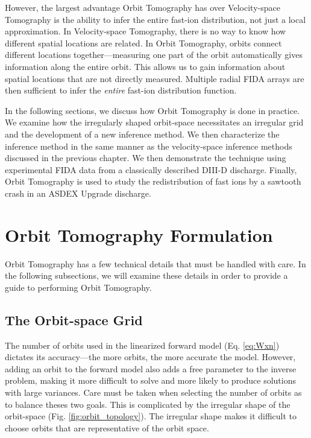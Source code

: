 However, the largest advantage Orbit Tomography has over Velocity-space Tomography is the ability to infer the entire fast-ion distribution, not just a local approximation. In Velocity-space Tomography, there is no way to know how different spatial locations are related. In Orbit Tomography, orbits connect different locations together---measuring one part of the orbit automatically gives information along the entire orbit. This allows us to gain information about spatial locations that are not directly measured. Multiple radial FIDA arrays are then sufficient to infer the \textit{entire} fast-ion distribution function. 

In the following sections, we discuss how Orbit Tomography is done in practice. We examine how the irregularly shaped orbit-space necessitates an irregular grid and the development of a new inference method. We then characterize the inference method in the same manner as the velocity-space inference methods discussed in the previous chapter.
We then demonstrate the technique using experimental FIDA data from a classically described DIII-D discharge. Finally, Orbit Tomography is used to study the redistribution of fast ions by a sawtooth crash in an ASDEX Upgrade discharge.

\section{Orbit Tomography Formulation}\label{sec:orbit_tomography}
Orbit Tomography has a few technical details that must be handled with care. In the following subsections, we will examine these details in order to provide a guide to performing Orbit Tomography.

\subsection{The Orbit-space Grid}
The number of orbits used in the linearized forward model (Eq. \ref{eq:Wxn}) dictates its accuracy---the more orbits, the more accurate the model.
However, adding an orbit to the forward model also adds a free parameter to the inverse problem, making it more difficult to solve and more likely to produce solutions with large variances.
Care must be taken when selecting the number of orbits as to balance theses two goals.
This is complicated by the irregular shape of the orbit-space (Fig. \ref{fig:orbit_topology}). The irregular shape makes it difficult to choose orbits that are representative of the orbit space.

